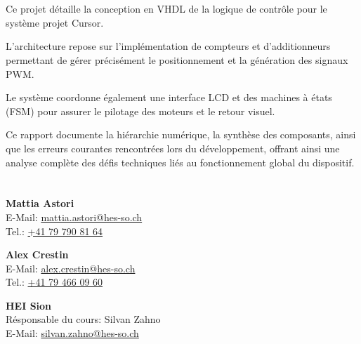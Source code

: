 

\section*{\vAbstractName}
\noindent

Ce projet détaille la conception en VHDL de la logique de contrôle pour le système projet Cursor. 

L'architecture repose sur l'implémentation de compteurs et d'additionneurs permettant de gérer précisément le positionnement et la génération des signaux PWM. 

Le système coordonne également une interface LCD et des machines à états (FSM) pour assurer le pilotage des moteurs et le retour visuel. 

Ce rapport documente la hiérarchie numérique, la synthèse des composants, ainsi que les erreurs courantes rencontrées lors du 
développement, offrant ainsi une analyse complète des défis techniques liés au fonctionnement global du dispositif.

\vspace{2cm}
\section*{\vContactsName}
\noindent
\textbf{Mattia Astori} \\
E-Mail: \href{mailto:mattia.astori@hes-so.ch}{mattia.astori@hes-so.ch} \\
Tel.: \href{tel:+41797908164}{+41 79 790 81 64}
\vspace{.5cm}

\textbf{Alex Crestin} \\
E-Mail: \href{mailto:alex.crestin@hes-so.ch}{alex.crestin@hes-so.ch} \\
Tel.: \href{tel:+41794660960}{+41 79 466 09 60}
\vspace{.5cm}

\textbf{HEI Sion} \\
Résponsable du cours: Silvan Zahno\\
E-Mail: \href{mailto:silvan.zahno@hes-so.ch}{silvan.zahno@hes-so.ch} \\

